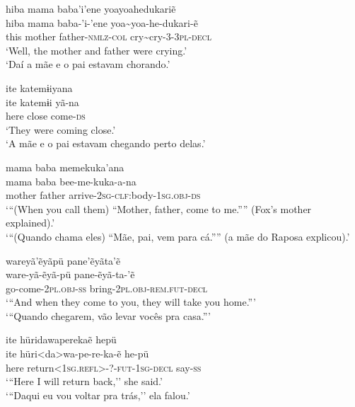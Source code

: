 \documentclass[output=paper,
modfonts,nonflat
]{langsci/langscibook}
\begin{document}
\ea   hiba mama baba'i'ene yoayoahedukariẽ \\[.3em]
\gll 	hiba mama baba-'i-'ene yoa\textasciitilde yoa-he-dukari-ẽ\\
this mother father-\textsc{nmlz-col} cry\textasciitilde cry-\textsc{3-3pl-decl}\\
\glt    `Well, the mother and father were crying.'\\
`Daí a mãe e o pai estavam chorando.'
\z  

\ea   ite katemɨiyana \\[.3em]
\gll 	ite katemɨi yã-na \\
here close come-\textsc{ds} \\
\glt   `They were coming close.' \\
`A mãe e o pai estavam chegando perto delas.'\\
\z 

\ea   mama  baba memekuka'ana \\[.3em]
\gll 	mama  baba bee-me-kuka-a-na\\
mother father arrive-\textsc{2sg-clf:}body-\textsc{1sg.obj-ds}\\
\glt   `{``}(When you call them) ``Mother, father, come to me.{''}{''} (Fox's mother explained).' \\
`{``}(Quando chama eles) ``Mãe, pai, vem para cá.{''}{''} (a mãe do Raposa explicou).'\\
\z 

\ea   wareyã'ẽyãpü pane'ẽyãta'ẽ \\[.3em]
\gll 	 ware-yã-ẽyã-pü pane-ẽyã-ta-'ẽ\\
go-come-\textsc{2pl.obj-ss} bring\textsc{-2pl.obj-rem.fut-decl}\\
\glt  `{``}And when they come to you, they will take you home.{''}' \\
`{``}Quando chegarem, vão levar vocês pra casa.{''}'\\
\z  

\ea   ite hüridawaperekaẽ hepü \\[.3em]
\gll 	ite hüri<da>wa-pe-re-ka-ẽ he-pü \\
here return\textsc{<1sg.refl>-?-fut-1sg-decl} say-\textsc{ss}\\
\glt   `{``}Here I will return back,'' she said.' \\
`{``}Daqui eu vou voltar pra trás,'' ela falou.'\\
\z  

\end{document}
